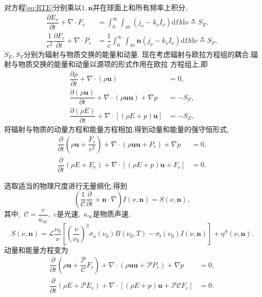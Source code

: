 \documentclass[a4paper, 11pt]{ctexart}
\numberwithin{equation}{section}
\numberwithin{figure}{section}
\newcommand\dd{\mathrm{d}}
\newcommand\bu{\boldsymbol{u}}
\newcommand\bn{\boldsymbol{n}}
\newcommand\pd[2]{\dfrac{\partial {#1}}{\partial {#2}}}
\begin{document}
对方程\eqref{eq:RTE}分别乘以$1,\bn$并在球面上和所有频率上积分,
\begin{align}
  \pd{E_r}{t}+\nabla\cdot F_r&=
  \int_0^\infty\int_{4\pi}(j_\nu-k_\nu I_\nu)\dd\Omega\dd\nu\triangleq S_E,\\
  \dfrac{1}{c^2}\pd{F_r}{t}+\nabla\cdot P_r&=
  \dfrac{1}{c}\int_0^\infty\int_{4\pi}\bn(j_\nu-k_\nu I_\nu)\dd\Omega\dd\nu\triangleq S_F,
\end{align}
$S_E,S_F$分别为辐射与物质交换的能量和动量.
现在考虑辐射与欧拉方程组的耦合,辐射与物质交换的能量和动量以源项的形式作用在欧拉
方程组上,即
\begin{align}
  \pd{\rho}{t}+\nabla\cdot(\rho\bu)&=0,\\
  \pd{(\rho\bu)}{t}+\nabla\cdot(\rho\bu\bu)+\nabla p&=-S_F,\\
  \pd{(\rho E)}{t}+\nabla\cdot[(\rho E+p)\bu]&=-S_E,
\end{align}
将辐射与物质的动量方程和能量方程相加,得到动量和能量的强守恒形式,
\begin{align}
\pd{}{t}(\rho\bu+\dfrac{F_r}{c^2})+\nabla\cdot(\rho\bu\bu+P_r)+\nabla p&=0,\\
  \pd{}{t}(\rho E+E_r)+\nabla\cdot[(\rho E+p)\bu+F_r]&=0.
\end{align}

选取适当的物理尺度进行无量纲化,得到
\begin{equation}
  (\dfrac{1}{\mathscr C}\pd{}{t}+\bn\cdot\nabla)I(\nu,\bn)=S(\nu,\bn),
\end{equation}
其中,~$\mathscr C=\dfrac{c}{a_\infty}$,~$c$是光速,~$a_\infty$是物质声速,
\begin{equation}
  S(\nu,\bn)={\mathscr L}\dfrac{\nu_0}{\nu}[(\dfrac{\nu}{\nu_0})^3
  \sigma_a(\nu_0)B(\nu_0,T)-\sigma_t(\nu_0)I(\nu,\bn)]+\eta^S(\nu,\bn).
\end{equation}
动量和能量方程变为
\begin{align}
  \pd{}{t}(\rho\bu+\dfrac{\mathscr P}{\mathscr
  C}F_r)+\nabla\cdot(\rho\bu\bu+{\mathscr P}P_r)+\nabla p&=0,\\
  \pd{}{t}(\rho E+{\mathscr P}E_r)+\nabla\cdot[(\rho E+p)\bu+{\mathscr {PC}}F_r]&=0.
\end{align}
\end{document}
